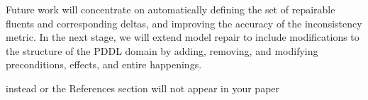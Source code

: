 \documentclass[letterpaper]{article} %
\begin{document}
Future work will concentrate on automatically defining the set of repairable fluents and corresponding deltas, and improving the accuracy of the inconsistency metric. In the next stage, we will extend model repair to include modifications to the structure of the PDDL domain by adding, removing, and modifying preconditions, effects, and entire happenings.


 instead or the References section will not appear in your paper


\end{document}
